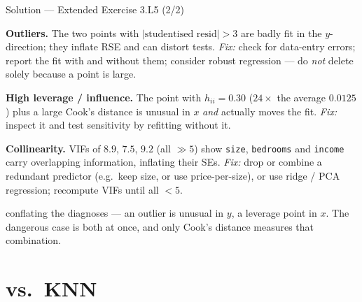 \documentclass[aspectratio=169,11pt]{beamer}
\begin{document}
\begin{frame}{Solution --- Extended Exercise 3.L5 (2/2)}
  \begin{solutionbox}
    \textbf{Outliers.} The two points with $|\text{studentised resid}|>3$
    are badly fit in the $y$-direction; they inflate RSE and can distort
    tests. \emph{Fix:} check for data-entry errors; report the fit with
    and without them; consider robust regression --- do \emph{not} delete
    solely because a point is large.

    \textbf{High leverage / influence.} The point with $h_{ii}=0.30$
    ($24\times$ the average $0.0125$) plus a large Cook's distance is
    unusual in $x$ \emph{and} actually moves the fit. \emph{Fix:} inspect
    it and test sensitivity by refitting without it.

    \textbf{Collinearity.} VIFs of $8.9$, $7.5$, $9.2$ (all $\gg 5$) show
    \texttt{size}, \texttt{bedrooms} and \texttt{income} carry overlapping
    information, inflating their SEs. \emph{Fix:} drop or combine a
    redundant predictor (e.g.\ keep size, or use price-per-size), or use
    ridge / PCA regression; recompute VIFs until all $<5$.
  \end{solutionbox}
  \begin{mistake}
    conflating the diagnoses --- an outlier is
    unusual in $y$, a leverage point in $x$. The dangerous case is both
    at once, and only Cook's distance measures that combination.
  \end{mistake}
\end{frame}

\section{vs.\ KNN}
\end{document}
